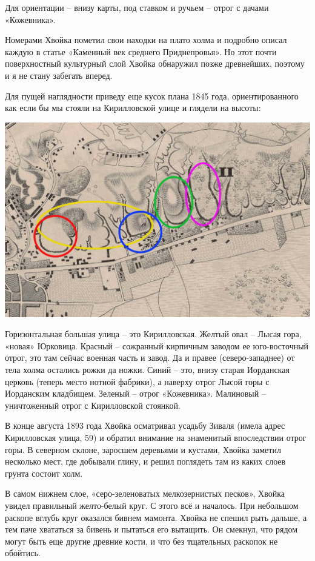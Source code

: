 Для ориентации – внизу карты, под ставком и ручьем – отрог с дачами «Кожевника».

Номерами Хвойка пометил свои находки на плато холма и подробно описал каждую в статье «Каменный век среднего Приднепровья». Но этот почти поверхностный культурный слой Хвойка обнаружил позже древнейших, поэтому и я не стану забегать вперед.

Для пущей наглядности приведу еще кусок плана 1845 года, ориентированного как если бы мы стояли на Кирилловской улице и глядели на высоты:

\begin{center}
\includegraphics[width=\linewidth]{chast-kirvys/kirstoy/1845-vmap.jpg}
\end{center}

Горизонтальная большая улица – это Кирилловская. Желтый овал – Лысая гора, «новая» Юрковица. Красный – сожранный кирпичным заводом ее юго-восточ\-ный отрог, это там сейчас военная часть и завод. Да и правее (северо-западнее) от тела холма остались рожки да ножки. Синий – это, внизу старая Иорданская церковь (теперь место нотной фабрики), а наверху отрог Лысой горы с Иорданским кладбищем. Зеленый – отрог «Кожевника». Малиновый – уничтоженный отрог с Кирилловской стоянкой.

В конце августа 1893 года Хвойка осматривал усадьбу Зиваля (имела адрес Кирилловская улица, 59) и обратил внимание на знаменитый впоследствии отрог горы. В северном склоне, заросшем деревьями и кустами, Хвойка заметил несколько мест, где добывали глину, и решил поглядеть там из каких слоев грунта состоит холм. 

В самом нижнем слое, «серо-зеленоватых мелкозернистых песков», Хвойка увидел правильный желто-белый круг. С этого всё и началось. При небольшом раскопе вглубь круг оказался бивнем мамонта. Хвойка не спешил рыть дальше, а тем паче хвататься за бивень и пытаться его вытащить. Он смекнул, что рядом могут быть еще другие древние кости, и что без тщательных раскопок не обойтись.

